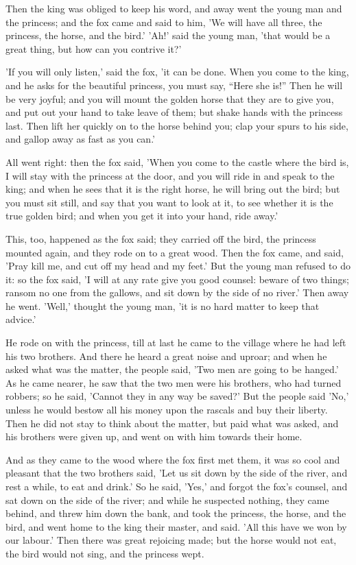 \documentclass[12pt]{book}
\begin{document}
Then the king was obliged to keep his word, and away went the young
man and the princess; and the fox came and said to him, 'We will have
all three, the princess, the horse, and the bird.' 'Ah!' said the
young man, 'that would be a great thing, but how can you contrive it?'

'If you will only listen,' said the fox, 'it can be done. When you
come to the king, and he asks for the beautiful princess, you must
say, ``Here she is!'' Then he will be very joyful; and you will mount
the golden horse that they are to give you, and put out your hand to
take leave of them; but shake hands with the princess last. Then lift
her quickly on to the horse behind you; clap your spurs to his side,
and gallop away as fast as you can.'

All went right: then the fox said, 'When you come to the castle where
the bird is, I will stay with the princess at the door, and you will
ride in and speak to the king; and when he sees that it is the right
horse, he will bring out the bird; but you must sit still, and say
that you want to look at it, to see whether it is the true golden
bird; and when you get it into your hand, ride away.'

This, too, happened as the fox said; they carried off the bird, the
princess mounted again, and they rode on to a great wood. Then the fox
came, and said, 'Pray kill me, and cut off my head and my feet.' But
the young man refused to do it: so the fox said, 'I will at any rate
give you good counsel: beware of two things; ransom no one from the
gallows, and sit down by the side of no river.' Then away he went.
'Well,' thought the young man, 'it is no hard matter to keep that
advice.'

He rode on with the princess, till at last he came to the village
where he had left his two brothers. And there he heard a great noise
and uproar; and when he asked what was the matter, the people said,
'Two men are going to be hanged.' As he came nearer, he saw that the
two men were his brothers, who had turned robbers; so he said, 'Cannot
they in any way be saved?' But the people said 'No,' unless he would
bestow all his money upon the rascals and buy their liberty. Then he
did not stay to think about the matter, but paid what was asked, and
his brothers were given up, and went on with him towards their home.

And as they came to the wood where the fox first met them, it was so
cool and pleasant that the two brothers said, 'Let us sit down by the
side of the river, and rest a while, to eat and drink.' So he said,
'Yes,' and forgot the fox's counsel, and sat down on the side of the
river; and while he suspected nothing, they came behind, and threw him
down the bank, and took the princess, the horse, and the bird, and
went home to the king their master, and said. 'All this have we won by
our labour.' Then there was great rejoicing made; but the horse would
not eat, the bird would not sing, and the princess wept.
\end{document}

